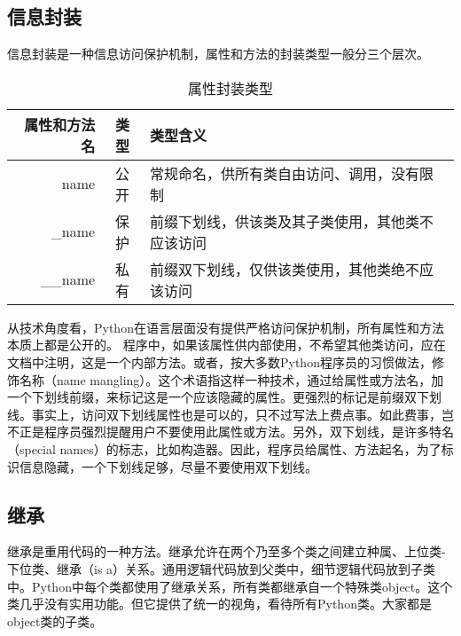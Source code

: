 \subsection{信息封装}
信息封装是一种信息访问保护机制，属性和方法的封装类型一般分三个层次。
\begin{table}
  \centering
  \begin{tabular}{rcl}
    \toprule
    属性和方法名 & 类型 & 类型含义 \\
    \midrule
    name        & 公开  & 常规命名，供所有类自由访问、调用，没有限制 \\
    \_name      & 保护  & 前缀下划线，供该类及其子类使用，其他类不应该访问 \\
    \_\_name    & 私有  & 前缀双下划线，仅供该类使用，其他类绝不应该访问 \\
    \bottomrule
  \end{tabular}
  \caption{属性封装类型}
\end{table}
从技术角度看，Python在语言层面没有提供严格访问保护机制，所有属性和方法本质上都是公开的。 程序中，如果该属性供内部使用，不希望其他类访问，应在文档中注明，这是一个内部方法。或者，按大多数Python程序员的习惯做法，修饰名称（name mangling）。这个术语指这样一种技术，通过给属性或方法名，加一个下划线前缀，来标记这是一个应该隐藏的属性。更强烈的标记是前缀双下划线。事实上，访问双下划线属性也是可以的，只不过写法上费点事。如此费事，岂不正是程序员强烈提醒用户不要使用此属性或方法。另外，双下划线，是许多特名（special names）的标志，比如构造器。因此，程序员给属性、方法起名，为了标识信息隐藏，一个下划线足够，尽量不要使用双下划线。

\subsection{继承}
继承是重用代码的一种方法。继承允许在两个乃至多个类之间建立种属、上位类-下位类、继承（is a）关系。通用逻辑代码放到父类中，细节逻辑代码放到子类中。Python中每个类都使用了继承关系，所有类都继承自一个特殊类object。这个类几乎没有实用功能。但它提供了统一的视角，看待所有Python类。大家都是object类的子类。


